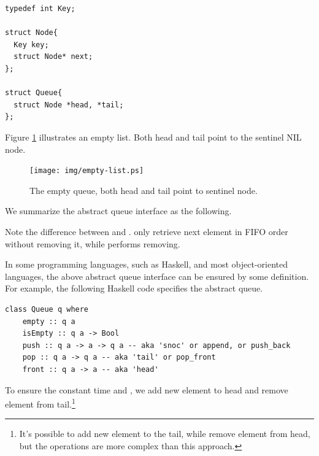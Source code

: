\documentclass{article}
\begin{document}
\lstset{language=C}
\begin{lstlisting}
typedef int Key;

struct Node{
  Key key;
  struct Node* next;
};

struct Queue{
  struct Node *head, *tail;
};
\end{lstlisting}

Figure \ref{fig:empty-list} illustrates an empty list. Both head
and tail point to the sentinel NIL node.

\begin{figure}[htbp]
  \centering
  \texttt{[image: img/empty-list.ps]}
  \caption{The empty queue, both head and tail point to sentinel node.} \label{fig:empty-list}
\end{figure}

We summarize the abstract queue interface as the following.

\begin{algorithmic}
\EndFunction
{}
\EndFunction
{}
\EndFunction
{}
\EndFunction
{}
\EndFunction
\end{algorithmic}

Note the difference between  and .
 only retrieve next element in FIFO order without removing
it, while  performs removing.

In some programming languages, such as Haskell, and most object-oriented
languages, the above abstract queue interface can be ensured by some definition.
For example, the following Haskell code specifies the abstract queue.

\lstset{language=Haskell}
\begin{lstlisting}
class Queue q where
    empty :: q a
    isEmpty :: q a -> Bool
    push :: q a -> a -> q a -- aka 'snoc' or append, or push_back
    pop :: q a -> q a -- aka 'tail' or pop_front
    front :: q a -> a -- aka 'head'
\end{lstlisting}

To ensure the constant time  and ,
we add new element to head and remove element from tail.\footnote{It's possible
to add new element to the tail, while remove element from head, but the
operations are more complex than this approach.}
\end{document}
